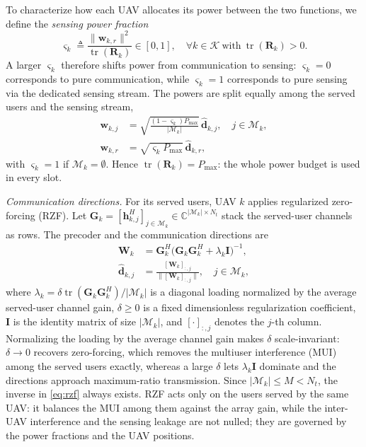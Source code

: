\documentclass[conference]{IEEEtran}
\begin{document}
To characterize how each UAV allocates its power between the two functions, we define the \emph{sensing power fraction}
\begin{equation}\label{eq:varsigma}
\varsigma_k\triangleq\frac{\|\mathbf w_{k,r}\|^2}{\operatorname{tr}(\mathbf R_k)}\in[0,1], \quad \forall k\in\mathcal K\ \text{with}\ \operatorname{tr}(\mathbf R_k)>0.
\end{equation}
A larger $\varsigma_k$ therefore shifts power from communication to sensing: $\varsigma_k=0$ corresponds to pure communication, while $\varsigma_k=1$ corresponds to pure sensing via the dedicated sensing stream. The powers are split equally among the served users and the sensing stream,
\begin{equation}\label{eq:restricted_beams}
\begin{aligned}
\mathbf w_{k,j}&=\sqrt{\tfrac{(1-\varsigma_k)P_{\max}}{|\mathcal M_k|}}\,\hat{\mathbf d}_{k,j},\quad j\in\mathcal M_k,\\
\mathbf w_{k,r}&=\sqrt{\varsigma_k P_{\max}}\,\hat{\mathbf d}_{k,r},
\end{aligned}
\end{equation}
with $\varsigma_k=1$ if $\mathcal M_k=\emptyset$. Hence $\operatorname{tr}(\mathbf R_k)=P_{\max}$: the whole power budget is used in every slot.

\emph{Communication directions.} For its served users, UAV $k$ applies regularized zero-forcing (RZF). Let $\mathbf G_k=[\mathbf h_{k,j}^H]_{j\in\mathcal M_k}\in\mathbb C^{|\mathcal M_k|\times N_t}$ stack the served-user channels as rows. The precoder and the communication directions are
\begin{align}
\mathbf W_k&=\mathbf G_k^H\big(\mathbf G_k\mathbf G_k^H+\lambda_k\mathbf I\big)^{-1},\label{eq:rzf}\\
\hat{\mathbf d}_{k,j}&=\frac{[\mathbf W_k]_{:,j}}{\big\|[\mathbf W_k]_{:,j}\big\|},\quad j\in\mathcal M_k,\label{eq:rzf_dir}
\end{align}
where $\lambda_k=\delta\operatorname{tr}(\mathbf G_k\mathbf G_k^H)/|\mathcal M_k|$ is a diagonal loading normalized by the average served-user channel gain, $\delta\ge0$ is a fixed dimensionless regularization coefficient, $\mathbf I$ is the identity matrix of size $|\mathcal M_k|$, and $[\cdot]_{:,j}$ denotes the $j$-th column. Normalizing the loading by the average channel gain makes $\delta$ scale-invariant: $\delta\to0$ recovers zero-forcing, which removes the multiuser interference (MUI) among the served users exactly, whereas a large $\delta$ lets $\lambda_k\mathbf I$ dominate and the directions approach maximum-ratio transmission. Since $|\mathcal M_k|\le M<N_t$, the inverse in \eqref{eq:rzf} always exists. RZF acts only on the users served by the same UAV: it balances the MUI among them against the array gain, while the inter-UAV interference and the sensing leakage are not nulled; they are governed by the power fractions and the UAV positions.
\end{document}
